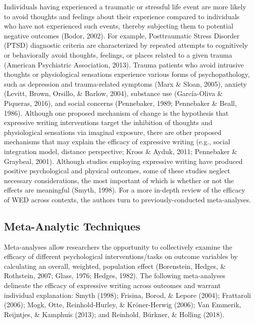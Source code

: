\documentclass[man]{apa6}
\newcounter{author}
\theoremstyle{definition}
\theoremstyle{definition}
\theoremstyle{definition}
\theoremstyle{remark}
\begin{document}
Individuals having experienced a traumatic or stressful life event are
more likely to avoid thoughts and feelings about their experience
compared to individuals who have not experienced such events, thereby
subjecting them to potential negative outcomes (Bodor, 2002). For
example, Posttraumatic Stress Disorder (PTSD) diagnostic criteria are
characterized by repeated attempts to cognitively or behaviorally avoid
thoughts, feelings, or places related to a given trauma (American
Psychiatric Association, 2013). Trauma patients who avoid intrusive
thoughts or physiological sensations experience various forms of
psychopathology, such as depression and trauma-related symptoms (Marx \&
Sloan, 2005), anxiety (Levitt, Brown, Orsillo, \& Barlow, 2004),
substance use (García-Oliva \& Piqueras, 2016), and social concerns
(Pennebaker, 1989; Pennebaker \& Beall, 1986). Although one proposed
mechanism of change is the hypothesis that expressive writing
interventions target the inhibition of thoughts and physiological
sensations via imaginal exposure, there are other proposed mechanisms
that may explain the efficacy of expressive writing (e.g., social
integration model, distance perspective; Kross \& Ayduk, 2011;
Pennebaker \& Graybeal, 2001). Although studies employing expressive
writing have produced positive psychological and physical outcomes, some
of these studies neglect necessary considerations, the most important of
which is whether or not the effects are meaningful (Smyth, 1998). For a
more in-depth review of the efficacy of WED across contexts, the authors
turn to previously-conducted meta-analyses.

\subsection{Meta-Analytic Techniques}\label{meta-analytic-techniques}

Meta-analyses allow researchers the opportunity to collectively examine
the efficacy of different psychological interventions/tasks on outcome
variables by calculating an overall, weighted, population effect
(Borenstein, Hedges, \& Rothstein, 2007; Glass, 1976; Hedges, 1982). The
following meta-analyses delineate the efficacy of expressive writing
across outcomes and warrant individual explanation: Smyth (1998);
Frisina, Borod, \& Lepore (2004); Frattaroli (2006); Mogk, Otte,
Reinhold-Hurley, \& Kröner-Herwig (2006); Van Emmerik, Reijntjes, \&
Kamphuis (2013); and Reinhold, Bürkner, \& Holling (2018).
\end{document}
